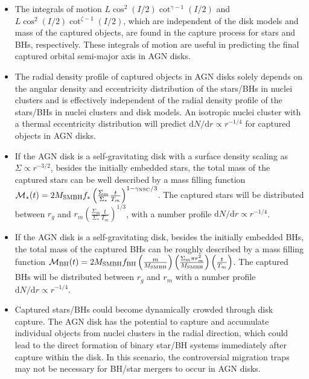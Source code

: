 \documentclass[fleqn,usenatbib]{mnras}
\newcommand{\dd}[0]{\mathrm{d}}
\begin{document}
\begin{itemize}
    \item The integrals of motion $L\cos^2(I/2)\cot^{\gamma-1}(I/2)$ and $L\cos^2(I/2)\cot^{\zeta-1}(I/2)$, which are independent of the disk models and mass of the captured objects, are found in the capture process for stars and BHs, respectively. These integrals of motion are useful in predicting the final captured orbital semi-major axis in AGN disks.

    \item The radial density profile of captured objects in AGN disks solely depends on the angular density and eccentricity distribution of the stars/BHs in nuclei clusters and is effectively independent of the radial density profile of the stars/BHs in nuclei clusters and disk models. An isotropic nuclei cluster with a thermal eccentricity distribution will predict $\dd N/\dd r\propto r^{-1/4}$ for captured objects in AGN disks.

    \item If the AGN disk is a self-gravitating disk with a surface density scaling as $\Sigma\propto r^{-3/2}$, {besides the initially embedded stars}, the total mass of the captured stars can be well described by a mass filling function $\mathcal{M}_*(t)=2M_{\rm SMBH}f_* \left(\frac{\Sigma_m}{\Sigma_*}\frac{t}{T_m}\right)^{1-\gamma_{\rm NSC}/3}$. The captured stars will be distributed between $r_g$ and $r_m\left(\frac{\Sigma_m}{\Sigma_*}\frac{t}{T_m}\right)^{1/3}$, with a number profile $\dd N/\dd r\propto r^{-1/4}$.

    \item If the AGN disk is a self-gravitating disk, {besides the initially embedded BHs}, the total mass of the captured BHs can be roughly described by a mass filling function $\mathcal{M}_{\rm BH}(t)=2M_{\rm SMBH}f_{\rm BH}\left(\frac{m}{M_{\rm SMBH}}\right)\left(\frac{\Sigma_m\pi r_m^2}{M_{\rm SMBH}}\right)\left(\frac{t}{T_m}\right)$. The captured BHs will be distributed between $r_g$ and $r_m$ with a number profile $\dd N/\dd r\propto r^{-1/4}$.

    \item Captured stars/BHs could become dynamically crowded through disk capture. The AGN disk has the potential to capture and accumulate individual objects from nuclei clusters in the radial direction, which could lead to the direct formation of binary star/BH systems immediately after capture within the disk. In this scenario, the controversial migration traps may not be necessary for BH/star mergers to occur in AGN disks.
\end{itemize}
\end{document}
